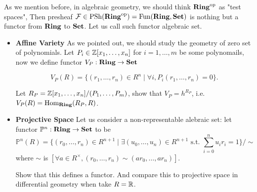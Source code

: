 \begin{example}
As we mention before, in algebraic geometry, we should think $\mathbf{Ring}^{\mathrm{op}}$ as "test spaces", Then presheaf $\mathcal{F}\in \mathrm{PSh}(\mathbf{Ring}^{\mathrm{op}}) = \mathrm{Fun}(\mathbf{Ring},\mathbf{Set})$ is nothing but a functor from $\mathbf{Ring}$ to $\mathbf{Set}$. Let us call such functor algebraic set.
  \begin{itemize}

    \item \textbf{Affine Variety}
  As we pointed out, we should study the geometry of zero set of polynomials. Let $P_i \in \mathbb{Z}[x_1,\ldots,x_n] $ for $i=1,\ldots,m$ be some polynomails, now we define functor $V_P: \mathbf{Ring} \to \mathbf{Set}$

    \[
      V_{P}(R) = \{ (r_1,\ldots,r_n) \in R^n \mid \forall i, P_i(r_1,\ldots,r_n) =0 \}.
    \]
  \begin{exercise}
    Let $R_P= \mathbb{Z}[x_1,\ldots,x_n]/(P_1,\ldots,P_m)$, show that $V_P= h^{R_P}$, i.e. $ V_P(R)= \mathrm{Hom}_{\mathbf{Ring}}(R_P, R)$. 
  \end{exercise}
\item \textbf{Projective Space}
  Let us consider a non-representable alebraic set: let functor $\mathbb{P}^n : \mathbf{Ring} \to \mathbf{Set}$ to be
    \[
      \mathbb{P}^n(R) = \{ (r_0,\ldots,r_n) \in R^{n+1} \mid \exists  (u_0,\ldots,u_n) \in R^{n+1} \text{ s.t. } \sum_{i=0}^n u_ir_i =1 \}/ \sim 
    \]
    where $\sim$ is $[\forall a\in R^{\times}, (r_0,\ldots,r_n)\sim (ar_0,\ldots,ar_n)]$.
  \begin{exercise}
    Show that this defines a functor. And compare this to projective space in differential geometry when take $R=\mathbb{R}$.
  \end{exercise}
  \end{itemize}
\end{example}

